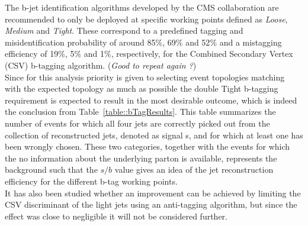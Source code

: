 The b-jet identification algorithms developed by the CMS collaboration are recommended to only be deployed at specific working points defined as \textit{Loose}, \textit{Medium} and \textit{Tight}.
These correspond to a predefined tagging and misidentification probability of around 85$\%$, 69$\%$ and 52$\%$ and a mistagging efficiency of 19$\%$, 5$\%$ and 1$\%$, respectively, for the Combined Secondary Vertex (CSV) b-tagging algorithm. (\textit{Good to repeat again ?})\\
Since for this analysis priority is given to selecting event topologies matching with the expected topology as much as possible the double Tight b-tagging requirement is expected to result in the most desirable outcome, which is indeed the conclusion from Table~\ref{table::bTagResults}.
This table summarizes the number of events for which all four jets are correctly picked out from the collection of reconstructed jets, denoted as signal s, and for which at least one has been wrongly chosen. These two categories, together with the events for which the no information about the underlying parton is available, represents the background such that the $s/b$ value gives an idea of the jet reconstruction efficiency for the different b-tag working points.
\\
It has also been studied whether an improvement can be achieved by limiting the CSV discriminant of the light jets using an anti-tagging algorithm, but since the effect was close to negligible it will not be considered further.
%
